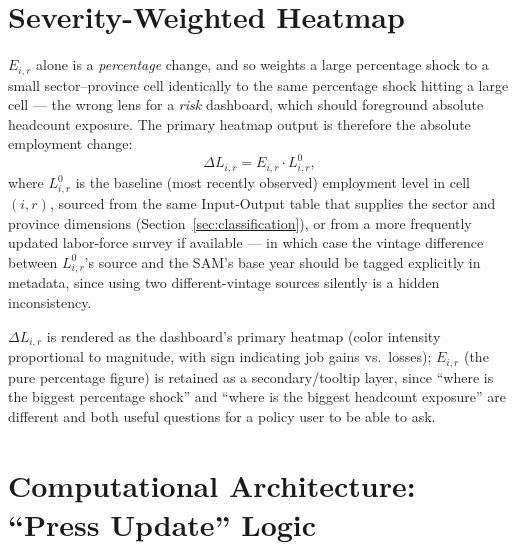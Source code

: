 \documentclass[11pt]{article}
\begin{document}
\section{Severity-Weighted Heatmap}
\label{sec:heatmap}

$E_{i,r}$ alone is a \emph{percentage} change, and so weights a large
percentage shock to a small sector--province cell identically to the same
percentage shock hitting a large cell --- the wrong lens for a \emph{risk}
dashboard, which should foreground absolute headcount exposure. The primary
heatmap output is therefore the absolute employment change:
\begin{equation}
  \Delta L_{i,r} = E_{i,r} \cdot L_{i,r}^{0},
  \label{eq:DeltaL}
\end{equation}
where $L_{i,r}^0$ is the baseline (most recently observed) employment level
in cell $(i,r)$, sourced from the same Input-Output table that supplies the
sector and province dimensions (Section~\ref{sec:classification}), or from a
more frequently updated labor-force survey if available --- in which case
the vintage difference between $L_{i,r}^0$'s source and the SAM's base year
should be tagged explicitly in metadata, since using two different-vintage
sources silently is a hidden inconsistency.

$\Delta L_{i,r}$ is rendered as the dashboard's primary heatmap (color
intensity proportional to magnitude, with sign indicating job gains vs.\
losses); $E_{i,r}$ (the pure percentage figure) is retained as a
secondary/tooltip layer, since ``where is the biggest percentage shock'' and
``where is the biggest headcount exposure'' are different and both useful
questions for a policy user to be able to ask.

\section{Computational Architecture: ``Press Update'' Logic}
\label{sec:architecture}
\end{document}

